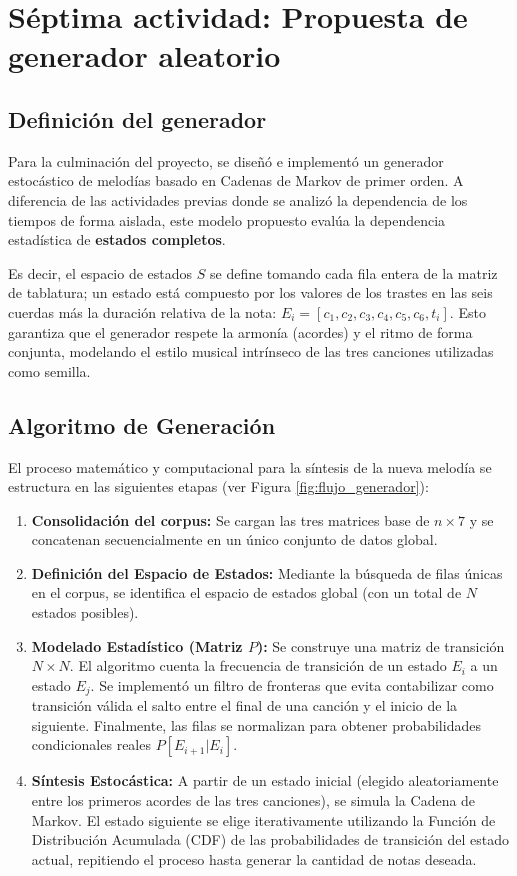 \documentclass{article}
\theoremstyle{plain}
\theoremstyle{definition}
\begin{document}
\section*{Séptima actividad: Propuesta de generador aleatorio}

\subsection*{Definición del generador}
Para la culminación del proyecto, se diseñó e implementó un generador estocástico de melodías basado en Cadenas de Markov de primer orden. A diferencia de las actividades previas donde se analizó la dependencia de los tiempos de forma aislada, este modelo propuesto evalúa la dependencia estadística de \textbf{estados completos}.

Es decir, el espacio de estados $S$ se define tomando cada fila entera de la matriz de tablatura; un estado está compuesto por los valores de los trastes en las seis cuerdas más la duración relativa de la nota: $E_i = [c_1, c_2, c_3, c_4, c_5, c_6, t_i]$. Esto garantiza que el generador respete la armonía (acordes) y el ritmo de forma conjunta, modelando el estilo musical intrínseco de las tres canciones utilizadas como semilla.

\subsection*{Algoritmo de Generación}
El proceso matemático y computacional para la síntesis de la nueva melodía se estructura en las siguientes etapas (ver Figura \ref{fig:flujo_generador}):

\begin{enumerate}
	\item \textbf{Consolidación del corpus:} Se cargan las tres matrices base de $n \times 7$ y se concatenan secuencialmente en un único conjunto de datos global.
	\item \textbf{Definición del Espacio de Estados:} Mediante la búsqueda de filas únicas en el corpus, se identifica el espacio de estados global (con un total de $N$ estados posibles).
	\item \textbf{Modelado Estadístico (Matriz $P$):} Se construye una matriz de transición $N \times N$. El algoritmo cuenta la frecuencia de transición de un estado $E_i$ a un estado $E_j$. Se implementó un filtro de fronteras que evita contabilizar como transición válida el salto entre el final de una canción y el inicio de la siguiente. Finalmente, las filas se normalizan para obtener probabilidades condicionales reales $P[E_{i+1}|E_i]$.
	\item \textbf{Síntesis Estocástica:} A partir de un estado inicial (elegido aleatoriamente entre los primeros acordes de las tres canciones), se simula la Cadena de Markov. El estado siguiente se elige iterativamente utilizando la Función de Distribución Acumulada (CDF) de las probabilidades de transición del estado actual, repitiendo el proceso hasta generar la cantidad de notas deseada.
\end{enumerate}
\end{document}
